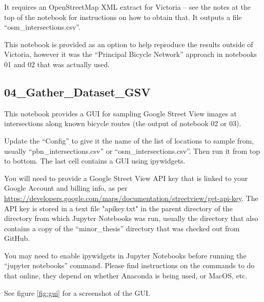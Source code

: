 \documentclass[11pt,twoside]{report}
\begin{document}
It requires an OpenStreetMap XML extract for Victoria -- see the notes at the top of the notebook for instructions on how to obtain that.   It outputs a file ``osm\_intersections.csv''.

This notebook is provided as an option to help reproduce the results outside of Victoria, however it was the ``Principal Bicycle Network'' approach in notebooks 01 and 02 that was actually used.

\subsection{04\_Gather\_Dataset\_GSV}
\label{aj04}

This notebook provides a GUI for sampling Google Street View images at intersections along known bicycle routes (the output of notebook 02 or 03).

Update the ``Config'' to give it the name of the list of locations to sample from, usually ``pbn\_intersections.csv'' or ``osm\_intersections.csv''.  Then run it from top to bottom.  The last cell contains a GUI using ipywidgets.

You will need to provide a Google Street View API key that is linked to your Google Account and billing info, as per \url{https://developers.google.com/maps/documentation/streetview/get-api-key}.  The API key is stored in a text file "apikey.txt" in the parent directory of the directory from which Jupyter Notebooks was run, usually the directory that also contains a copy of the ``minor\_thesis'' directory that was checked out from GitHub.

You may need to enable ipywidgets in Jupyter Notebooks before running the ``jupyter notebooks'' command.  Please find instructions on the commands to do that online, they depend on whether Anaconda is being used, or MacOS, etc.

See figure \ref{fig:gui} for a screenshot of the GUI.
\end{document}
